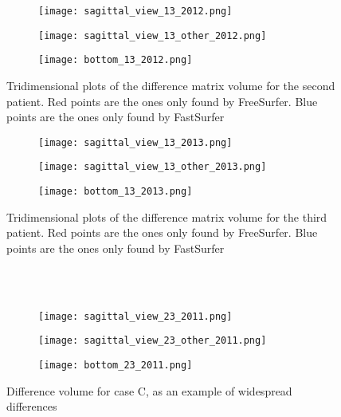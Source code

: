 \documentclass{article}
\begin{document}
	\begin{figure} [h!]
		\centering
		\begin{subfigure} [b] {0.33\linewidth} \texttt{[image: sagittal\_view\_13\_2012.png]}
		\end{subfigure}
		\hfill
		\begin{subfigure} [b] {0.33\linewidth} \texttt{[image: sagittal\_view\_13\_other\_2012.png]}
		\end{subfigure}
		\hfill
		\begin{subfigure} [b] {0.37\linewidth} \texttt{[image: bottom\_13\_2012.png]}
		\end{subfigure}
		\caption{Tridimensional plots of the difference matrix volume for the second patient. Red points are the ones only found by FreeSurfer. Blue points are the ones only found by FastSurfer}
		\label{Fig: 3D 2012}
	\end{figure}
	\begin{figure} [h!]
		\centering
		\begin{subfigure} [b] {0.33\linewidth} \texttt{[image: sagittal\_view\_13\_2013.png]}
		\end{subfigure}
		\hfill
		\begin{subfigure} [b] {0.33\linewidth} \texttt{[image: sagittal\_view\_13\_other\_2013.png]}
		\end{subfigure}
		\hfill
		\begin{subfigure} [b] {0.37\linewidth} \texttt{[image: bottom\_13\_2013.png]}
		\end{subfigure}
		\caption{Tridimensional plots of the difference matrix volume for the third patient. Red points are the ones only found by FreeSurfer. Blue points are the ones only found by FastSurfer}
		\label{Fig: 3D 2013}
	\end{figure}	
	\\
	\\
	\begin{figure} [h!]
		\centering
		\begin{subfigure} [b] {0.4\linewidth} \texttt{[image: sagittal\_view\_23\_2011.png]}
		\end{subfigure}
		\hfill
		\begin{subfigure} [b] {0.4\linewidth} \texttt{[image: sagittal\_view\_23\_other\_2011.png]}
		\end{subfigure}
		\hfill
		\begin{subfigure} [b] {0.45\linewidth} \texttt{[image: bottom\_23\_2011.png]}
		\end{subfigure}
		\caption{Difference volume for case C, as an example  of widespread differences}
		\label{Fig: 3D_caseC_2011}
	\end{figure} 
\end{document}

